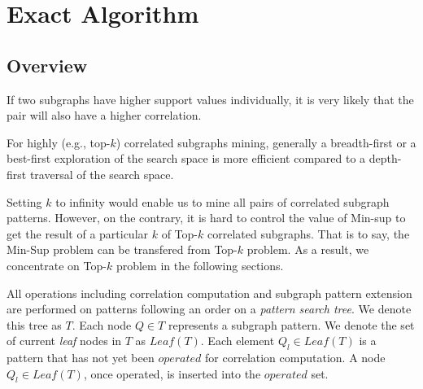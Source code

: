 \section{Exact Algorithm}
\label{sec:exact_algo}

\subsection{Overview}
\label{subsec:exact_algo_overview}

\begin{observation}
	\label{ob:frequency}
	If two subgraphs have higher support values individually, it is very likely
	that the pair will also have a higher correlation.
\end{observation}

\begin{observation}
	\label{ob:dfs}
	For highly (e.g., top-$k$) correlated subgraphs mining, generally a
	breadth-first or a best-first exploration of the search space is more
	efficient compared to a depth-first traversal of the search space.
\end{observation}

Setting $k$ to infinity would enable us to mine all pairs of correlated subgraph
patterns. However, on the contrary, it is hard to control the value of {\sf
Min-sup} to get the result of a particular $k$ of {\sf Top-$k$} correlated
subgraphs. That is to say, the {\sf Min-Sup} problem can be transfered from {\sf
Top-$k$} problem. As a result, we concentrate on {\sf Top-$k$} problem in the
following sections.

 All operations including
correlation computation and subgraph pattern extension are performed on patterns
following an order on a \textit{pattern search tree}. We denote this tree as
$T$. Each node $Q\in T$ represents a subgraph pattern. We denote the set of
current \textit{leaf} nodes in $T$ as $Leaf(T)$. Each element $Q_l\in Leaf(T)$
is a pattern that has not yet been $operated$ for correlation computation. A
node $Q_l\in Leaf(T)$, once operated, is inserted into the $operated$ set.


